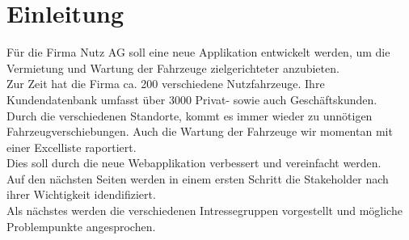 \section{Einleitung}
Für die Firma Nutz AG soll eine neue Applikation entwickelt werden, um die Vermietung und Wartung der Fahrzeuge zielgerichteter anzubieten.\\
Zur Zeit hat die Firma ca. 200 verschiedene Nutzfahrzeuge. Ihre Kundendatenbank umfasst über 3000 Privat- sowie auch Geschäftskunden.\\
Durch die verschiedenen Standorte, kommt es immer wieder zu unnötigen Fahrzeugverschiebungen. Auch die Wartung der Fahrzeuge wir momentan mit einer Excelliste raportiert.\\[2ex]
%
Dies soll durch die neue Webapplikation verbessert und vereinfacht werden.\\
Auf den nächsten Seiten werden in einem ersten Schritt die Stakeholder nach ihrer Wichtigkeit idendifiziert.\\
Als nächstes werden die verschiedenen Intressegruppen vorgestellt und mögliche Problempunkte angesprochen.\\
